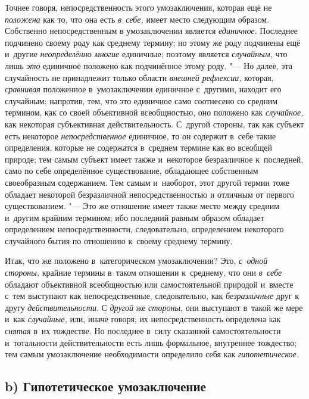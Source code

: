 Точнее говоря, непосредственность этого умозаключения, которая
ещё не {\em положена} как
то, что она есть {\em в~себе,}
имеет место следующим образом. Собственно непосредственным в
умозаключении является {\em единичное}.
Последнее подчинено своему роду как среднему термину; но
этому же роду подчинены ещё и~другие
{\em неопределённо многие}
единичные; поэтому является
{\em случайным,} что лишь
{\em это} единичное
положено как подчинённое этому роду. "--- Но далее, эта
случайность не принадлежит только области
{\em внешней рефлексии,}
которая, {\em сравнивая}
положенное в~умозаключении единичное с~другими, находит его
случайным; напротив, тем, что это единичное само соотнесено со средним
термином, как со своей объективной всеобщностью, оно положено как
{\em случайное,} как
некоторая субъективная действительность. С~другой стороны, так как субъект
есть некоторое {\em непосредственное}
единичное, то он содержит в~себе такие определения, которые
не содержатся в~среднем термине как во всеобщей природе; тем самым субъект
имеет также и~некоторое безразличное к~последней, само по себе определённое
существование, обладающее собственным своеобразным
содержанием. Тем самым и~наоборот, этот другой
термин
тоже обладает некоторой безразличной непосредственностью и
отличным от первого существованием. "--- Это же отношение имеет
также место между средним и~другим крайним термином; ибо последний равным
образом обладает определением непосредственности, следовательно,
определением некоторого случайного бытия по отношению к~своему среднему
термину.

Итак, что же положено в~категорическом умозаключении? Это,
{\em с~одной стороны,}
крайние термины в~таком отношении к~среднему, что они
{\em в~себе} обладают
объективной всеобщностью или самостоятельной природой и~вместе с~тем
выступают как непосредственные, следовательно, как
{\em безразличные} друг к
другу {\em действительности}.
С {\em другой}
же {\em стороны,}
они выступают в~такой же мере и~как
{\em случайные,} или,
иначе говоря, их непосредственность определена как
{\em снятая} в~их
тождестве. Но последнее в~силу сказанной самостоятельности и~тотальности
действительности есть лишь формальное, внутреннее тождество; тем самым
умозаключение необходимости определило себя как
{\em гипотетическое}.

\subsection[b) Гипотетическое умозаключение]{b) Гипотетическое умозаключение}

